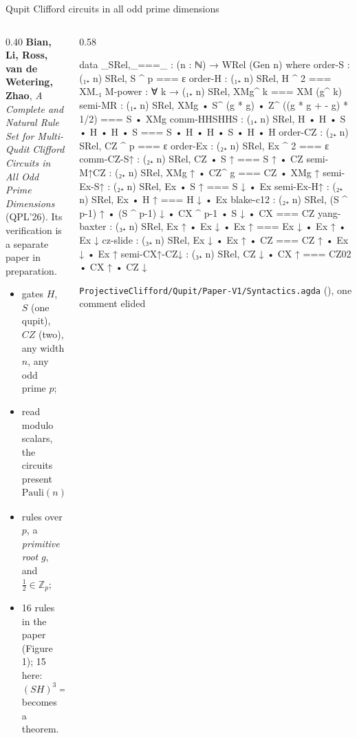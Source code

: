 \begin{frame}{Qupit Clifford circuits in all odd prime dimensions \New}
\begin{columns}[c]
\begin{column}{0.40\textwidth}
\small
\textbf{Bian, Li, Ross, van de Wetering, Zhao}, \emph{A Complete and Natural
Rule Set for Multi-Qudit Clifford Circuits in All Odd Prime Dimensions}
(QPL'26). Its verification is a separate paper in preparation.
\begin{itemize}
  \item gates $H$, $S$ (one qupit), $CZ$ (two), any width $n$, any odd prime $p$;
  \item read \alert{modulo scalars}, the circuits present
        \[\text{Pauli}(n)\rtimes Sp(2n,\mathbb{Z}_p);\]
  \item rules over $p$, a \emph{primitive root} $g$, and $\frac12\in\mathbb{Z}_p$;
  \item 16 rules in the paper (Figure 1); 15 here: $(SH)^3=\varepsilon$
        becomes a theorem.
\end{itemize}
\end{column}
\begin{column}{0.58\textwidth}
\renewcommand{\AgdaCodeStyle}{\scriptsize}
\begin{code}
data _SRel,_===_ : (n : ℕ) → WRel (Gen n) where
  order-S :       (₁₊ n) SRel,  S ^ p === ε
  order-H :       (₁₊ n) SRel,  H ^ 2 === XM₋₁
  M-power : ∀ k → (₁₊ n) SRel,  XMg^ k === XM (g^ k)
  semi-MR :       (₁₊ n) SRel,  XMg • S^ (g * g) • Z^ ((g * g + - g) * 1/2)
                                === S • XMg
  comm-HHSHHS :   (₁₊ n) SRel,  H • H • S • H • H • S === S • H • H • S • H • H
  order-CZ :      (₂₊ n) SRel,  CZ ^ p === ε
  order-Ex :      (₂₊ n) SRel,  Ex ^ 2 === ε
  comm-CZ-S↑ :    (₂₊ n) SRel,  CZ • S ↑ === S ↑ • CZ
  semi-M↑CZ :     (₂₊ n) SRel,  XMg ↑ • CZ^ g === CZ • XMg ↑
  semi-Ex-S↑ :    (₂₊ n) SRel,  Ex • S ↑ === S ↓ • Ex
  semi-Ex-H↑ :    (₂₊ n) SRel,  Ex • H ↑ === H ↓ • Ex
  blake-c12 :     (₂₊ n) SRel,  (S ^ p-1) ↑ • (S ^ p-1) ↓ • CX ^ p-1 • S ↓ • CX === CZ
  yang-baxter :   (₃₊ n) SRel,  Ex ↑ • Ex ↓ • Ex ↑ === Ex ↓ • Ex ↑ • Ex ↓
  cz-slide :      (₃₊ n) SRel,  Ex ↓ • Ex ↑ • CZ === CZ ↑ • Ex ↓ • Ex ↑
  semi-CX↑-CZ↓ :  (₃₊ n) SRel,  CZ ↓ • CX ↑ === CZ02 • CX ↑ • CZ ↓
\end{code}
{\scriptsize \texttt{ProjectiveClifford/Qupit/Paper-V1/Syntactics.agda} (), one comment elided}
\end{column}
\end{columns}
\end{frame}

